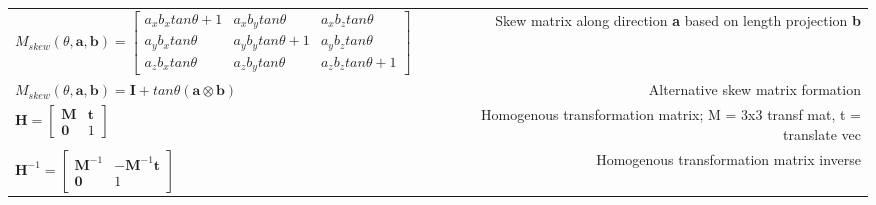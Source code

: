 {\setlength{\extrarowheight}{10pt}

\begin{tabulary}{8in}{LR}

$ M_{skew}(\theta, \textbf{a}, \textbf{b}) = \begin{bmatrix}
a_x b_x tan \theta + 1 & a_x b_y tan \theta & a_x b_z tan \theta \\
a_y b_x tan \theta & a_y b_y tan \theta + 1 & a_y b_z tan \theta \\
a_z b_x tan \theta & a_z b_y tan \theta & a_z b_z tan \theta + 1
\end{bmatrix}
$
& Skew matrix along direction \textbf{a} based on length projection \textbf{b} \\

$ M_{skew}(\theta, \textbf{a}, \textbf{b}) = \textbf{I} + tan \theta (\textbf{a} \otimes \textbf{b})$
&  Alternative skew matrix formation \\

$\textbf{H} = \begin{bmatrix}\textbf{M} & \textbf{t} \\ \textbf{0} & 1 \end{bmatrix} $
& Homogenous transformation matrix; M = 3x3 transf mat, t = translate vec \\

$\textbf{H}^{-1} = \begin{bmatrix}
\textbf{M}^{-1} & -\textbf{M}^{-1}\textbf{t} \\ \textbf{0} & 1 
\end{bmatrix} $
& Homogenous transformation matrix inverse \\

\end{tabulary}
}
